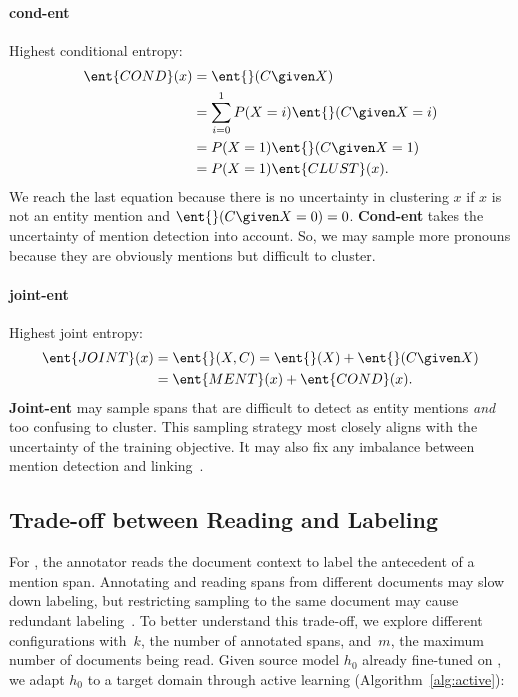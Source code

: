 \paragraph{cond-ent} Highest conditional entropy:
\begin{equation}
\begin{split}
    \ent{COND}(x)
        &= \ent{}(C \given X) \\
        &= \sum_{i=0}^1 P(X=i) \ent{}(C \given X = i) \\
        &= P(X=1) \ent{}(C \given X=1) \\
        &= P(X=1) \ent{CLUST}(x).
\end{split}
\end{equation}
We reach the last equation because there is no uncertainty in
clustering $x$ if $x$ is not an entity mention and $\ent{}(C \given X=0) = 0$.
\textbf{Cond-ent} takes the uncertainty of mention detection into
account.  So, we may sample more pronouns because they are
obviously mentions but difficult to cluster.

\paragraph{joint-ent} Highest joint entropy:
\begin{align}
    \ent{JOINT}(x)
        &= \ent{}(X,C) = \ent{}(X) + \ent{}(C \given X) \nonumber \\
        &= \ent{MENT}(x) + \ent{COND}(x).
\end{align}
\textbf{Joint-ent} may sample spans that are difficult to detect as entity mentions
\emph{and} too confusing to
cluster.
This sampling strategy most closely aligns with the uncertainty of the
training objective. It may also fix any imbalance between mention detection and
linking~\citep{wu-2020}.


\subsection{Trade-off between Reading and Labeling}
\label{ssec:tradeoff}

For \coref{}, the annotator reads the document context
to label the antecedent of a mention span.
Annotating and reading spans from different documents may slow down labeling,
but restricting sampling to the same
document may cause redundant labeling~\citep{miller-2012}.
To better understand this trade-off, we explore different
configurations with~$k$, the number of annotated spans, and~$m$, the maximum number of
documents being read.  Given source model $h_0$ already
fine-tuned on \ontonotes{}, we adapt $h_0$ to a target
domain through active learning (Algorithm~\ref{alg:active}):


